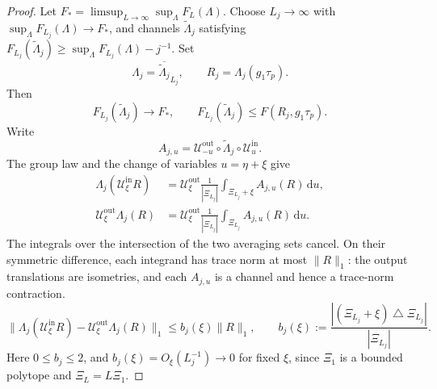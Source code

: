 \documentclass[11pt]{article}
\theoremstyle{remark}
\theoremstyle{plain}
\newcommand{\dd}{\mathrm d}
\begin{document}
\begin{proof}
Let \(F_*=\limsup_{L\to\infty}\sup_\Lambda F_L(\Lambda)\).  Choose
\(L_j\to\infty\) with \(\sup_\Lambda F_{L_j}(\Lambda)\to F_*\), and channels
\(\widetilde\Lambda_j\) satisfying
\(F_{L_j}(\widetilde\Lambda_j)\ge\sup_\Lambda F_{L_j}(\Lambda)-j^{-1}\).
Set
\[
  \Lambda_j=\overline{\widetilde\Lambda_j}_{L_j},
  \qquad R_j=\Lambda_j(g_1\tau_p).
\]
Then
\begin{equation}\label{eq:unified-maximizing-sequence}
  F_{L_j}(\widetilde\Lambda_j)\longrightarrow F_*,
  \qquad
  F_{L_j}(\widetilde\Lambda_j)\le F(R_j,g_1\tau_p).
\end{equation}
Write
\[
  A_{j,u}=\mathcal U_{-u}^{\mathrm{out}}\circ
    \widetilde\Lambda_j\circ\mathcal U_u^{\mathrm{in}}.
\]
The group law and the change of variables \(u=\eta+\xi\) give
\[
\begin{aligned}
  \Lambda_j(\mathcal U_\xi^{\mathrm{in}}R)
  &=\mathcal U_\xi^{\mathrm{out}}
    \frac1{|\Xi_{L_j}|}\int_{\Xi_{L_j}+\xi}A_{j,u}(R)\,\dd u,\\
  \mathcal U_\xi^{\mathrm{out}}\Lambda_j(R)
  &=\mathcal U_\xi^{\mathrm{out}}
    \frac1{|\Xi_{L_j}|}\int_{\Xi_{L_j}}A_{j,u}(R)\,\dd u.
\end{aligned}
\]
The integrals over the intersection of the two
averaging sets cancel.  On their symmetric difference, each integrand
has trace norm at most \(\|R\|_1\): the output translations are
isometries, and each \(A_{j,u}\) is a channel and hence a trace-norm
contraction.
\begin{equation}\label{eq:unified-approx-covariance}
  \|\Lambda_j(\mathcal U_\xi^{\mathrm{in}}R)
    -\mathcal U_\xi^{\mathrm{out}}\Lambda_j(R)\|_1
  \le b_j(\xi)\|R\|_1,
  \qquad
  b_j(\xi):=
  \frac{|(\Xi_{L_j}+\xi)\mathbin\triangle\Xi_{L_j}|}{|\Xi_{L_j}|}.
\end{equation}
Here \(0\le b_j\le2\), and \(b_j(\xi)=O_\xi(L_j^{-1})\to0\) for fixed
\(\xi\), since \(\Xi_1\) is a bounded polytope and \(\Xi_L=L\Xi_1\).


\end{proof}
\end{document}
